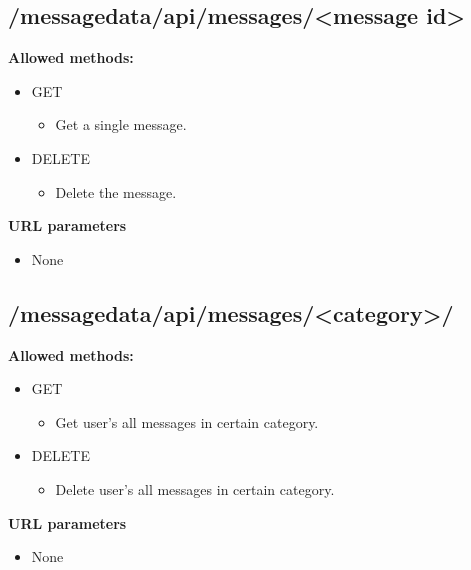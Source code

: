 \documentclass[letterpaper,10pt,english]{sphinxmanual}
\begin{document}
\subsection{/messagedata/api/messages/\textless{}message id\textgreater{}}
\label{restdoc:messagedata-api-messages-message-id}
\textbf{Allowed methods:}
\begin{itemize}
\item {} 
GET
\begin{itemize}
\item {} 
Get a single message.

\end{itemize}

\item {} 
DELETE
\begin{itemize}
\item {} 
Delete the message.

\end{itemize}

\end{itemize}

\textbf{URL parameters}
\begin{itemize}
\item {} 
None

\end{itemize}


\subsection{/messagedata/api/messages/\textless{}category\textgreater{}/}
\label{restdoc:messagedata-api-messages-category}
\textbf{Allowed methods:}
\begin{itemize}
\item {} 
GET
\begin{itemize}
\item {} 
Get user's all messages in certain category.

\end{itemize}

\item {} 
DELETE
\begin{itemize}
\item {} 
Delete user's all messages in certain category.

\end{itemize}

\end{itemize}

\textbf{URL parameters}
\begin{itemize}
\item {} 
None

\end{itemize}
\end{document}
